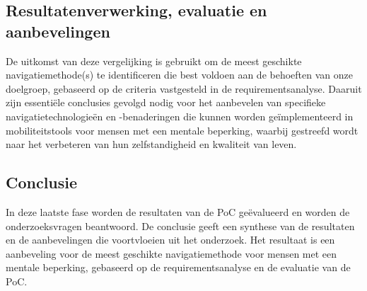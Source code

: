 \subsection*{Resultatenverwerking, evaluatie en aanbevelingen}

De uitkomst van deze vergelijking is gebruikt om de meest geschikte navigatiemethode(s) te identificeren die best voldoen aan de behoeften van onze doelgroep, gebaseerd op de criteria vastgesteld in de requirementsanalyse. Daaruit zijn essentiële conclusies gevolgd nodig voor het aanbevelen van specifieke navigatietechnologieën en -benaderingen die kunnen worden geïmplementeerd in mobiliteitstools voor mensen met een mentale beperking, waarbij gestreefd wordt naar het verbeteren van hun zelfstandigheid en kwaliteit van leven.

\subsection*{Conclusie}

In deze laatste fase worden de resultaten van de PoC geëvalueerd en worden de onderzoeksvragen beantwoord. De conclusie geeft een synthese van de resultaten en de aanbevelingen die voortvloeien uit het onderzoek. Het resultaat is een aanbeveling voor de meest geschikte navigatiemethode voor mensen met een mentale beperking, gebaseerd op de requirementsanalyse en de evaluatie van de PoC.
